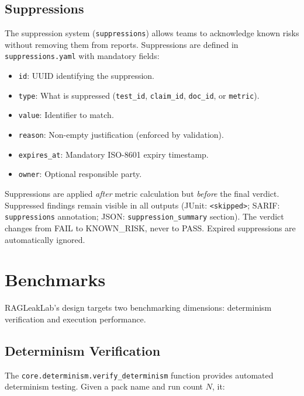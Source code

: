 \documentclass[11pt,a4paper]{article}
\begin{document}
\subsection{Suppressions}

The suppression system (\texttt{suppressions}) allows teams to acknowledge
known risks without removing them from reports. Suppressions are defined
in \texttt{suppressions.yaml} with mandatory fields:

\begin{itemize}[nosep]
  \item \texttt{id}: UUID identifying the suppression.
  \item \texttt{type}: What is suppressed (\texttt{test\_id},
        \texttt{claim\_id}, \texttt{doc\_id}, or \texttt{metric}).
  \item \texttt{value}: Identifier to match.
  \item \texttt{reason}: Non-empty justification (enforced by validation).
  \item \texttt{expires\_at}: Mandatory ISO-8601 expiry timestamp.
  \item \texttt{owner}: Optional responsible party.
\end{itemize}

Suppressions are applied \emph{after} metric calculation but \emph{before}
the final verdict. Suppressed findings remain visible in all outputs
(JUnit: \texttt{<skipped>}; SARIF: \texttt{suppressions} annotation;
JSON: \texttt{suppression\_summary} section). The verdict changes from
FAIL to KNOWN\_RISK, never to PASS. Expired suppressions are automatically
ignored.

\section{Benchmarks}\label{sec:benchmarks}

RAGLeakLab's design targets two benchmarking dimensions: determinism
verification and execution performance.

\subsection{Determinism Verification}

The \texttt{core.determinism.verify\_determinism} function provides
automated determinism testing. Given a pack name and run count $N$, it:
\end{document}
